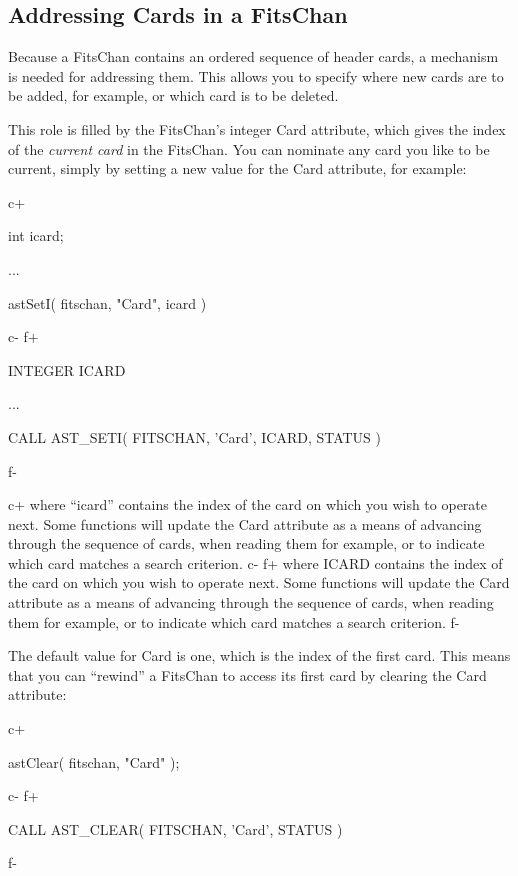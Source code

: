 \documentclass[twoside,11pt]{starlink}
\begin{document}
{\subsection{\label{ss:addressingfitscards}Addressing Cards in a FitsChan}

Because a FitsChan contains an ordered sequence of header cards, a
mechanism is needed for addressing them. This allows you to specify
where new cards are to be added, for example, or which card is to be
deleted.

This role is filled by the FitsChan's integer Card attribute, which
gives the index of the \emph{current card} in the FitsChan.  You can
nominate any card you like to be current, simply by setting a new
value for the Card attribute, for example:

c+
\small
\begin{terminalv}
int icard;

...

astSetI( fitschan, "Card", icard )
\end{terminalv}
\normalsize
c-
f+
\small
\begin{terminalv}
      INTEGER ICARD

      ...

      CALL AST_SETI( FITSCHAN, 'Card', ICARD, STATUS )
\end{terminalv}
\normalsize
f-

c+
where ``icard'' contains the index of the card on which you wish to
operate next.  Some functions will update the Card attribute as a
means of advancing through the sequence of cards, when reading them
for example, or to indicate which card matches a search criterion.
c-
f+
where ICARD contains the index of the card on which you wish to
operate next.  Some functions will update the Card attribute as a
means of advancing through the sequence of cards, when reading them
for example, or to indicate which card matches a search criterion.
f-

The default value for Card is one, which is the index of the first
card. This means that you can ``rewind'' a FitsChan to access its
first card by clearing the Card attribute:

c+
\small
\begin{terminalv}
astClear( fitschan, "Card" );
\end{terminalv}
\normalsize
c-
f+
\small
\begin{terminalv}
      CALL AST_CLEAR( FITSCHAN, 'Card', STATUS )
\end{terminalv}
\normalsize
f-

}
\end{document}
